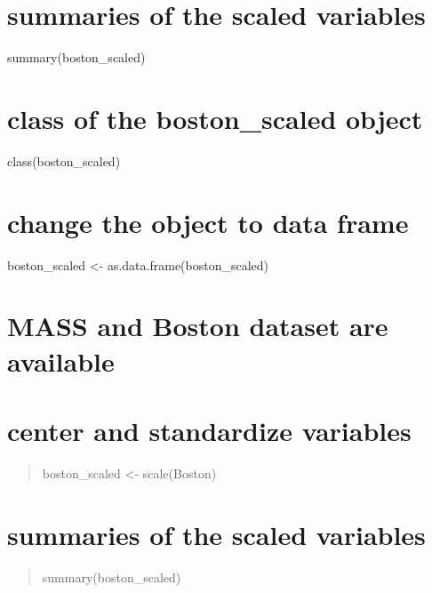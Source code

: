 \documentclass[]{article}
\begin{document}
\section{summaries of the scaled
variables}\label{summaries-of-the-scaled-variables}

summary(boston\_scaled)

\section{class of the boston\_scaled
object}\label{class-of-the-boston_scaled-object}

class(boston\_scaled)

\section{change the object to data
frame}\label{change-the-object-to-data-frame}

boston\_scaled \textless{}- as.data.frame(boston\_scaled)

\section{MASS and Boston dataset are
available}\label{mass-and-boston-dataset-are-available-1}

\begin{quote}
\end{quote}

\section{center and standardize
variables}\label{center-and-standardize-variables-1}

\begin{quote}
boston\_scaled \textless{}- scale(Boston)
\end{quote}

\begin{quote}
\end{quote}

\section{summaries of the scaled
variables}\label{summaries-of-the-scaled-variables-1}

\begin{quote}
summary(boston\_scaled)
\end{quote}
\end{document}

